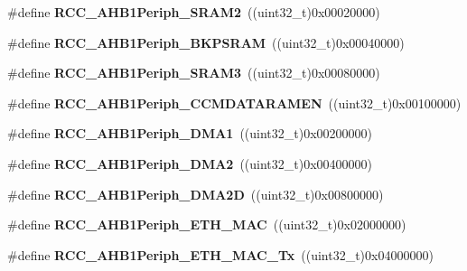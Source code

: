 \begin{DoxyCompactItemize}
\#define {\bfseries R\+C\+C\+\_\+\+A\+H\+B1\+Periph\+\_\+\+S\+R\+A\+M2}~((uint32\+\_\+t)0x00020000)
\item 
\mbox{\label{group___r_c_c___a_h_b1___peripherals_ga5c43076e3c58665332122f2da55f885f}} 
\#define {\bfseries R\+C\+C\+\_\+\+A\+H\+B1\+Periph\+\_\+\+B\+K\+P\+S\+R\+AM}~((uint32\+\_\+t)0x00040000)
\item 
\mbox{\label{group___r_c_c___a_h_b1___peripherals_gab4393edee56d02b7605b1e269097ed1d}} 
\#define {\bfseries R\+C\+C\+\_\+\+A\+H\+B1\+Periph\+\_\+\+S\+R\+A\+M3}~((uint32\+\_\+t)0x00080000)
\item 
\mbox{\label{group___r_c_c___a_h_b1___peripherals_ga85a1df0763fa42208189a738b2a4d9c1}} 
\#define {\bfseries R\+C\+C\+\_\+\+A\+H\+B1\+Periph\+\_\+\+C\+C\+M\+D\+A\+T\+A\+R\+A\+M\+EN}~((uint32\+\_\+t)0x00100000)
\item 
\mbox{\label{group___r_c_c___a_h_b1___peripherals_ga2353b6d37cf54175b6a5b71038d7ae1e}} 
\#define {\bfseries R\+C\+C\+\_\+\+A\+H\+B1\+Periph\+\_\+\+D\+M\+A1}~((uint32\+\_\+t)0x00200000)
\item 
\mbox{\label{group___r_c_c___a_h_b1___peripherals_ga18b2ad600629e2b0a87553167c63d417}} 
\#define {\bfseries R\+C\+C\+\_\+\+A\+H\+B1\+Periph\+\_\+\+D\+M\+A2}~((uint32\+\_\+t)0x00400000)
\item 
\mbox{\label{group___r_c_c___a_h_b1___peripherals_gaaa5e899b971cf0051a77571e01876000}} 
\#define {\bfseries R\+C\+C\+\_\+\+A\+H\+B1\+Periph\+\_\+\+D\+M\+A2D}~((uint32\+\_\+t)0x00800000)
\item 
\mbox{\label{group___r_c_c___a_h_b1___peripherals_gafe79098122ff46546939086ccf6f4658}} 
\#define {\bfseries R\+C\+C\+\_\+\+A\+H\+B1\+Periph\+\_\+\+E\+T\+H\+\_\+\+M\+AC}~((uint32\+\_\+t)0x02000000)
\item 
\mbox{\label{group___r_c_c___a_h_b1___peripherals_gabd21e7036567b9fc67c631fb9487ef3e}} 
\#define {\bfseries R\+C\+C\+\_\+\+A\+H\+B1\+Periph\+\_\+\+E\+T\+H\+\_\+\+M\+A\+C\+\_\+\+Tx}~((uint32\+\_\+t)0x04000000)

\end{DoxyCompactItemize}
